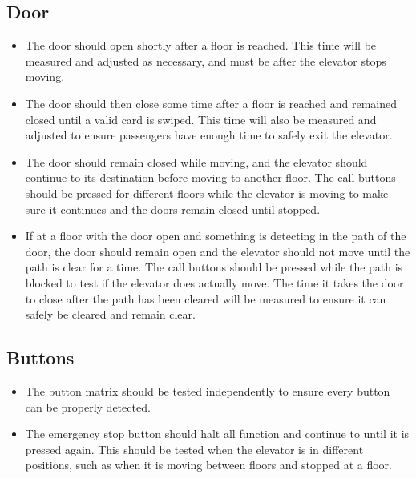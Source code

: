 \documentclass{article}
\begin{document}
	    \subsection{Door}
	    \begin{itemize}
	        \item The door should open shortly after a floor is reached. This time will be measured and adjusted as necessary, and must be after the elevator stops moving.
	        \item The door should then close some time after a floor is reached and remained closed until a valid card is swiped. This time will also be measured and adjusted to ensure passengers have enough time to safely exit the elevator.
	        \item The door should remain closed while moving, and the elevator should continue to its destination before moving to another floor. The call buttons should be pressed for different floors while the elevator is moving to make sure it continues and the doors remain closed until stopped.
	        \item If at a floor with the door open and something is detecting in the path of the door, the door should remain open and the elevator should not move until the path is clear for a time. The call buttons should be pressed while the path is blocked to test if the elevator does actually move. The time it takes the door to close after the path has been cleared will be measured to ensure it can safely be cleared and remain clear.
	    \end{itemize}
	    
	    \subsection{Buttons}
	    \begin{itemize}
	        \item The button matrix should be tested independently to ensure every button can be properly detected.
	        \item The emergency stop button should halt all function and continue to until it is pressed again. This should be tested when the elevator is in different positions, such as when it is moving between floors and stopped at a floor.
	    \end{itemize}
	    
	    \newpage
	    \nocite{*}
        
        
\end{document}
